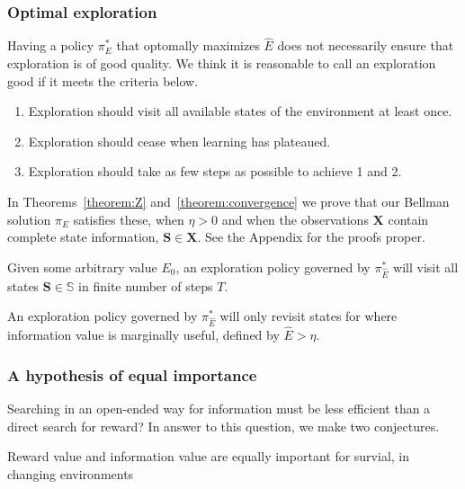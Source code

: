 \subsubsection*{Optimal exploration}
Having a policy $\pi_E^*$ that optomally maximizes $\hat E$ does not necessarily ensure that exploration is of good quality. We think it is reasonable to call an exploration good if it meets the criteria below. 

\begin{enumerate}
	\item Exploration should visit all available states of the environment at least once.
	\item Exploration should cease when learning has plateaued.
	\item Exploration should take as few steps as possible to achieve 1 and 2.
\end{enumerate}

In Theorems~\ref{theorem:Z} and~\ref{theorem:convergence} we prove that our Bellman solution $\pi_E$ satisfies these, when $\eta > 0$ and when the observations $\mathbf{X}$ contain complete state information, $\mathbf{S} \in \mathbf{X}$. See the Appendix for the proofs proper.

\begin{theorem} 
	\label{theorem:Z} 
	Given some arbitrary value $E_0$, an exploration policy governed by $\pi^*_{\hat E}$ will visit all states $\mathbf{S} \in \mathbb{S}$ in finite number of steps $T$.
\end{theorem}

\begin{theorem} 
	\label{theorem:convergence} 
	An exploration policy governed by $\pi^*_{\hat E}$ will only revisit states for where information value is marginally useful, defined by $\hat E > \eta$.  
\end{theorem}


\subsubsection*{A hypothesis of equal importance}
 Searching in an open-ended way for information must be less efficient than a direct search for reward? In answer to this question, we make two conjectures.

\begin{conjecture}
	Reward value and information value are equally important for survial, in changing environments 
\end{conjecture}

